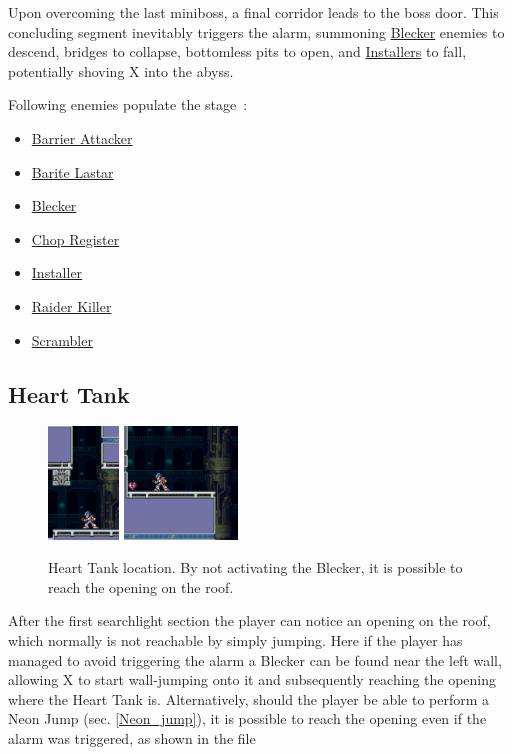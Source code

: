 Upon overcoming the last miniboss, a final corridor leads to the boss door. This concluding segment inevitably triggers the alarm, summoning \hyperlink{enem:Blecker}{Blecker} enemies to descend, bridges to collapse, bottomless pits to open, and \hyperlink{enem:Installer}{Installers} to fall, potentially shoving X into the abyss.

Following enemies populate the stage~\cite{wiki:Central_computer}:
\begin{itemize}
	\item \hyperlink{enem:Barrier_Attacker}{Barrier Attacker}
	\item \hyperlink{enem:Barite_Lastar}{Barite Lastar}
	\item \hyperlink{enem:Blecker}{Blecker}
	\item \hyperlink{miniboss:Chop_Register}{Chop Register}
	\item \hyperlink{enem:Installer}{Installer}
	\item \hyperlink{miniboss:Raider_Killer}{Raider Killer}
	\item \hyperlink{enem:Scrambler}{Scrambler}
\end{itemize}

\subsection{Heart Tank}
\begin{figure}[htp]
	\centering
	\includegraphics[height=3cm]{figures/X2/Magna_centipede/Centipede_heart_1.png}
	\includegraphics[height=3cm]{figures/X2/Magna_centipede/Centipede_heart_2.png}
	\caption{Heart Tank location. By not activating the Blecker, it is possible to reach the opening on the roof.}
\end{figure}
After the first searchlight section the player can notice an opening on the roof, which normally is not reachable by simply jumping. Here if the player has managed to avoid triggering the alarm a Blecker can be found near the left wall, allowing X to start wall-jumping onto it and subsequently reaching the opening where the Heart Tank is. Alternatively, should the player be able to perform a Neon Jump (sec. \ref{Neon_jump}), it is possible to reach the opening even if the alarm was triggered, as shown in the file 

